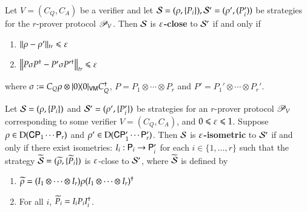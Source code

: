 \begin{definition}
	Let $V = (C_Q,C_A)$ be a verifier and let $\mathcal{S} = (\rho,\{P_i\}), \mathcal{S}' = (\rho',(P_i'))$ be strategies for the $r$-prover protocol $\mathscr{P}_V$. Then $\mathcal{S}$ is \textbf{$\varepsilon$-close} to $\mathcal{S}'$ if and only if
	\begin{enumerate}
		\item $ \lVert \rho - \rho'\rVert_{tr} \leqslant \varepsilon$
		\item $\left\lVert P \sigma P^\dagger - P' \sigma P'^\dagger \right\rVert_{tr} \leqslant \varepsilon$		
		
	\end{enumerate}
where $\sigma := C_Q \rho \otimes |0\rangle\! \langle 0|_{{\mathsf{V}} {\mathsf{M}}} C_Q^\dagger$, $P = P_1 \otimes \cdots \otimes P_r$ and $P' = P_1' \otimes \cdots \otimes P_r'$.

\end{definition}

\begin{definition}
	Let $\mathcal{S} = (\rho,\{P_i\})$ and $\mathcal{S}' = (\rho',\{P_i'\})$ be strategies for an $r$-prover protocol $\mathscr{P}_V$ corresponding to some verifier $V = (C_Q,C_A)$, and $0\leqslant \varepsilon\leqslant 1$. Suppose $\rho \in \mathrm{D}({\mathsf{C}} {\mathsf{P}}_1 \cdots {\mathsf{P}}_r)$ and $\rho' \in \mathrm{D}({\mathsf{C}} {\mathsf{P}}_1' \cdots {\mathsf{P}}_r')$. Then $\mathcal{S}$ is \textbf{$\varepsilon$-isometric} to $\mathcal{S}'$ if and only if there exist isometries: $I_i : {\mathsf{P}}_i \to {\mathsf{P}}_i'$ for each $i\in\{1,\ldots,r\}$ such that the strategy $\widetilde{\mathcal{S}} = (\widetilde{\rho}, \{ \widetilde{P}_i \})$ is $\varepsilon$-close to $\mathcal{S}'$, where $\widetilde{\mathcal{S}}$ is defined by
	\begin{enumerate}
		\item $\widetilde{\rho} = (I_1 \otimes \cdots \otimes I_r) \rho (I_1 \otimes \cdots \otimes I_r)^\dagger$
		\item For all $i$, $\widetilde{P}_i = I_i P_i I_i^\dagger$.
	\end{enumerate}
\end{definition}


